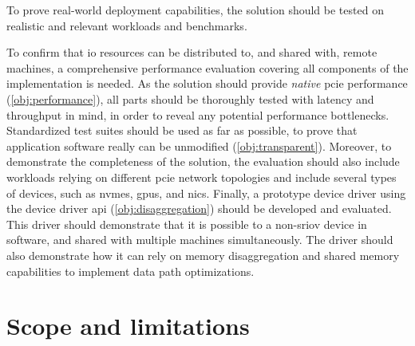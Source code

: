 \begin{objective}\label{obj:experiments}
    To prove real-world deployment capabilities, the solution should be tested on realistic and relevant workloads and benchmarks.
\end{objective}
To confirm that \gls{io} resources can be distributed to, and shared with, remote machines, a comprehensive performance evaluation covering all components of the implementation is needed.
As the solution should provide \emph{native} \gls{pcie} performance (\cref{obj:performance}), all parts should be thoroughly tested with latency and throughput in mind, in order to reveal any potential performance bottlenecks.
Standardized test suites should be used as far as possible, to prove that application software really can be unmodified (\cref{obj:transparent}).
%
Moreover, to demonstrate the completeness of the solution, the evaluation should also include workloads relying on different \gls{pcie} network topologies and include several types of devices, such as \glspl{nvme}, \glspl{gpu}, and \glspl{nic}.
%
Finally, a prototype device driver using the device driver \gls{api} (\cref{obj:disaggregation}) should be developed and evaluated. This driver should demonstrate that it is possible to  a non-\gls{sriov} device in software, and shared with multiple machines simultaneously. 
%
The driver should also demonstrate how it can rely on memory \gls{disaggregation} and shared memory capabilities to implement data path optimizations.



\section{Scope and limitations}\label{sec:scope}



